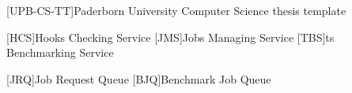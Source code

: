 \theoremstyle{plain}
\newtheorem{definition}{Definition}[chapter]
\newtheorem{lemma}[definition]{Lemma}
\ifgerman
	\newtheorem{theorem}[definition]{Satz}
	\newtheorem{corollary}[definition]{Korollar}
	\newtheorem{example}[definition]{Beispiel}
\else
	\newtheorem{theorem}[definition]{Theorem}
	\newtheorem{corollary}[definition]{Corollary}
	\newtheorem{example}[definition]{Example}
\fi



\newcommand*{\eg}{e.\,g.}
\newcommand*{\ie}{i.\,e.}
\newcommand*{\cf}{c.\,f.}
\newcommand*{\etal}{et~al.}

[UPB-CS-TT]{Paderborn University Computer Science thesis template}

\DeclareMathOperator{\testop}{top}


\newcommand*{\ts}{\acl*{ts}}
\newcommand*{\tsp}{\aclp*{ts}}
\newcommand*{\iguana}{\textsc{Iguana}}

\newcommand*{\gh}{GitHub}
\newcommand*{\dockh}{Docker Hub}

[HCS]{Hooks Checking Service}
[JMS]{Jobs Managing Service}
[TBS]{\ts{} Benchmarking Service}

[JRQ]{Job Request Queue}
[BJQ]{Benchmark Job Queue}


\lstset{
	basicstyle=\scriptsize\ttfamily,
	numbers=left
}